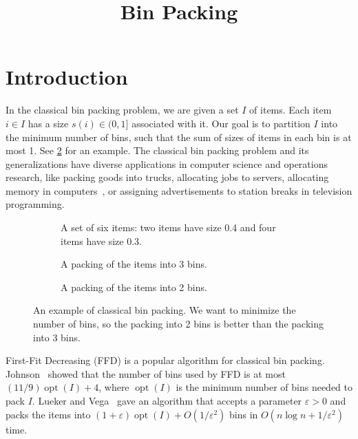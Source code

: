 \documentclass[a4paper,12pt,fleqn]{article}
\title{Bin Packing}
\author{\empty}
\date{\empty}
\DeclareMathOperator{\opt}{opt}
\let\eps\varepsilon
\begin{document}
\maketitle
\setlength{\parskip}{0.5em}

\section{Introduction}

In the classical bin packing problem, we are given a set $I$ of items.
Each item $i \in I$ has a size $s(i) \in (0, 1]$ associated with it.
Our goal is to partition $I$ into the minimum number of bins,
such that the sum of sizes of items in each bin is at most 1.
See \cref{fig:1bp} for an example.
The classical bin packing problem and its generalizations
have diverse applications in computer science and operations research,
like packing goods into trucks, allocating jobs to servers,
allocating memory in computers~\cite{handbook-of-combinopt-bp},
or assigning advertisements to station breaks in television programming.

\begin{figure}[!ht]
\centering
\begin{subfigure}{0.9\textwidth}
    \centering
    
    \caption{A set of six items: two items have size 0.4 and four items have size 0.3.}%
\label{fig:1bp:a}
\end{subfigure}
\par\bigskip\bigskip
\begin{subfigure}{0.45\textwidth}
    \centering
    
    \caption{A packing of the items into 3 bins.}
\end{subfigure}
\begin{subfigure}{0.45\textwidth}
    \centering
    
    \caption{A packing of the items into 2 bins.}
\end{subfigure}
\caption[An example of classical bin packing.]{An example of classical bin packing.
We want to minimize the number of bins, so the packing into 2 bins
is better than the packing into 3 bins.}
\label{fig:1bp}
\end{figure}

First-Fit Decreasing (FFD) is a popular algorithm for classical bin packing.
Johnson~\cite{johnson-thesis} showed that the number of bins used by
FFD is at most $(11/9)\opt(I) + 4$,
where $\opt(I)$ is the minimum number of bins needed to pack $I$.
Lueker and Vega~\cite{bp-aptas} gave an algorithm that accepts a parameter $\eps > 0$
and packs the items into $(1+\eps)\opt(I) + O(1/\eps^2)$ bins in $O(n\log n + 1/\eps^2)$ time.
\end{document}
